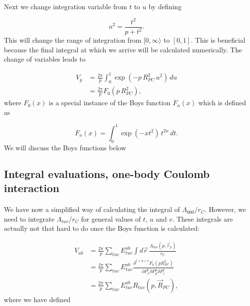 \documentclass[%
twoside,                 %
final,                   %
10pt]{article}
\begin{document}
\paragraph{}

Next we change integration variable from $t$ to $u$ by defining

\begin{equation}
 u^2 = \frac{t^2}{p + t^2}.
\end{equation}
This will change the range of integration from $[0,\infty\rangle$ to $[0,1]$. This is beneficial because the final integral at which we arrive will be calculated numerically.
The change of variables leads to

\begin{align}
\label{eq:V_p}
 V_p & = \frac{2\pi}{p}\int_0^1\exp(-p\,R^2_{PC}\,u^2)\,du \\
     & = \frac{2\pi}{p}F_0(p\,R^2_{PC}),
\end{align}
where $F_0(x)$ is a special instance of the Boys function $F_n(x)$ which is defined as

\begin{equation}
 F_n(x) = \int_0^1\exp(-xt^2)\,t^{2n}\,dt.
\end{equation}
We will discuss the Boys functions below



\subsection{Integral evaluations, one-body Coulomb interaction}

\paragraph{}

We have now a  simplified way of calculating the integral of $\Lambda_{000}/r_C$. However, we need to integrate $\Lambda_{tuv}/r_C$ for general values of $t$, $u$ and $v$.
These integrals are actually not that hard to do once the Boys function is calculated:

\begin{align}
 V_{ab} & = \frac{2\pi}{p}\sum_{tuv}E^{ab}_{tuv}\int d\vec r \, \frac{\Lambda_{tuv}(p,\vec r_p)}{r_C} \\
        & = \frac{2\pi}{p}\sum_{tuv}E^{ab}_{tuv} \frac{\partial^{t+u+v} F_0(p R^2_{PC})}{\partial P_x^t \partial P_y^u \partial P_z^v} \\
        & = \frac{2\pi}{p}\sum_{tuv}E^{ab}_{tuv} R_{tuv}(p,\vec R_{PC}), \label{eq:V_ab}
\end{align}
where we have defined
\end{document}
